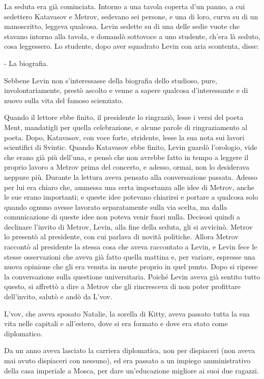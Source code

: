 La seduta era già cominciata. Intorno a una tavola coperta d'un panno, a cui sedettero Katavasov e Metrov, sedevano sei persone, e una di loro, curva su di un manoscritto, leggeva qualcosa. Levin sedette su di una delle sedie vuote che stavano intorno alla tavola, e domandò sottovoce a uno studente, ch'era là seduto, cosa leggessero. Lo studente, dopo aver squadrato Levin con aria scontenta, disse: 

- La biografia. 

Sebbene Levin non s'interessasse della biografia dello studioso, pure, involontariamente, prestò ascolto e venne a sapere qualcosa d'interessante e di nuovo sulla vita del famoso scienziato. 

Quando il lettore ebbe finito, il presidente lo ringraziò, lesse i versi del poeta Ment, mandatigli per quella celebrazione, e alcune parole di ringraziamento al poeta. Dopo, Katavasov, con voce forte, stridente, lesse la sua nota sui lavori scientifici di Svintic. Quando Katavasov ebbe finito, Levin guardò l'orologio, vide che erano già più dell'una, e pensò che non avrebbe fatto in tempo a leggere il proprio lavoro a Metrov prima del concerto, e adesso, ormai, non lo desiderava neppure più. Durante la lettura aveva pensato alla conversazione passata. Adesso per lui era chiaro che, ammessa una certa importanza alle idee di Metrov, anche le sue erano importanti; e queste idee potevano chiarirsi e portare a qualcosa solo quando ognuno avesse lavorato separatamente sulla via scelta, ma dalla comunicazione di queste idee non poteva venir fuori nulla. Decisosi quindi a declinare l'invito di Metrov, Levin, alla fine della seduta, gli si avvicinò. Metrov lo presentò al presidente, con cui parlava di novità politiche. Allora Metrov raccontò al presidente la stessa cosa che aveva raccontato a Levin, e Levin fece le stesse osservazioni che aveva già fatto quella mattina e, per variare, espresse una nuova opinione che gli era venuta in mente proprio in quel punto. Dopo si riprese la conversazione sulla questione universitaria. Poiché Levin aveva già sentito tutto questo, si affrettò a dire a Metrov che gli rincresceva di non poter profittare dell'invito, salutò e andò da L'vov. 

L'vov, che aveva sposato Natalie, la sorella di Kitty, aveva passato tutta la sua vita nelle capitali e all'estero, dove si era formato e dove era stato come diplomatico. 

Da un anno aveva lasciato la carriera diplomatica, non per dispiaceri (non aveva mai avuto dispiaceri con nessuno), ed era passato a un impiego amministrativo della casa imperiale a Mosca, per dare un'educazione migliore ai suoi due ragazzi. 

